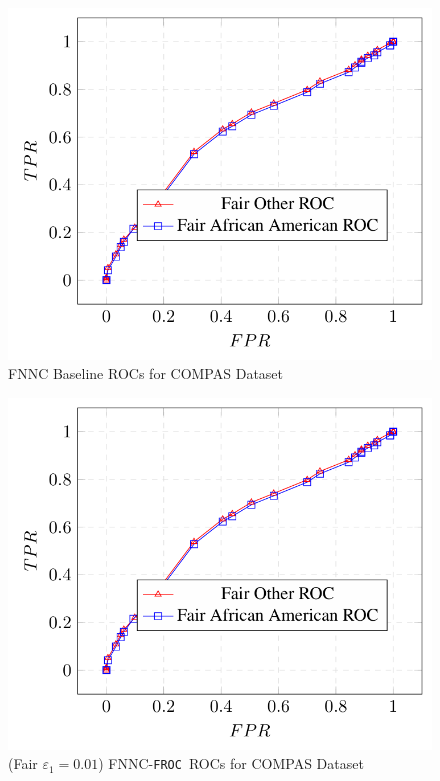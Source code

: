 \documentclass{article}
\newcommand{\ouralgo}{\texttt{FROC}}
\begin{document}
\begin{figure}[!h]
    \centering
    \includegraphics[width=1\linewidth]{Images/FNNC_COMPAS_Baseline_ROC_FROC.png}
    \caption{FNNC Baseline ROCs for COMPAS Dataset}
    \label{fig:FNNC_COMPAS_ROC}
\end{figure}

\begin{figure}[!h]
    \centering
    \includegraphics[width=1\linewidth]{Images/FNNC_COMPAS_Baseline_ROC_FROC.png}
    \caption{(Fair $\varepsilon_1 = 0.01$) FNNC-\ouralgo\   ROCs for COMPAS Dataset}
    \label{fig:FNNC_COMPAS_ROC_FROC}
\end{figure}
\end{document}
